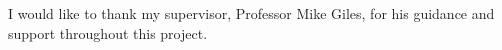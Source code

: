 \begin{acknowledgements}
I would like to thank my supervisor, Professor Mike Giles, for his guidance and support throughout this project.
\end{acknowledgements}
